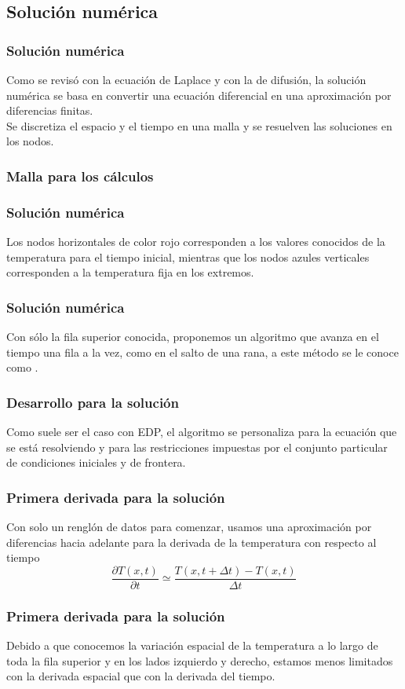 \subsection{Solución numérica}
\begin{frame}
\frametitle{Solución numérica}
Como se revisó con la ecuación de Laplace y con la de difusión, la solución numérica se basa en convertir una ecuación diferencial en una aproximación por diferencias finitas.
\\
\bigskip
Se discretiza el espacio y el tiempo en una malla y se resuelven las soluciones en los nodos.
\end{frame}
\begin{frame}
\frametitle{Malla para los cálculos}
\begin{figure}
	\centering
	
\end{figure}
\end{frame}
\begin{frame}
\frametitle{Solución numérica}
Los nodos horizontales de color rojo corresponden a los valores conocidos de la temperatura para el tiempo inicial, mientras que los nodos azules verticales corresponden a la temperatura fija en los extremos.
\end{frame}
\begin{frame}
\frametitle{Solución numérica}
Con sólo la fila superior conocida, proponemos un algoritmo que avanza en el tiempo una fila a la vez, como en el salto de una rana, a este método se le conoce como .
\end{frame}
\begin{frame}
\frametitle{Desarrollo para la solución}
Como suele ser el caso con EDP, el algoritmo se personaliza para la ecuación que se está resolviendo y para las restricciones impuestas por el conjunto particular de condiciones iniciales y de frontera.
\end{frame}
\begin{frame}
\frametitle{Primera derivada para la solución}
Con solo un renglón de datos para comenzar, usamos una aproximación por diferencias hacia adelante para la derivada de la temperatura con respecto al tiempo
\begin{equation}
\dfrac{\partial T(x,t)}{\partial t} \simeq \dfrac{T(x, t + \Delta t) - T(x, t)}{\Delta t}
\label{eq:ecuacion_17_68}
\end{equation}
\end{frame}
\begin{frame}
\frametitle{Primera derivada para la solución}
Debido a que conocemos la variación espacial de la temperatura a lo largo de toda la fila superior y en los lados izquierdo y derecho, estamos menos limitados con la derivada espacial que con la derivada del tiempo.
\end{frame}
